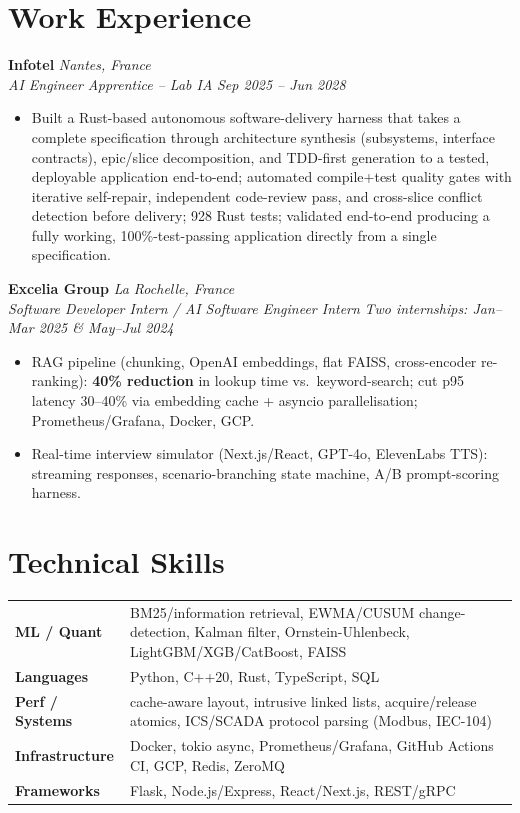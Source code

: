 \documentclass[10pt]{article}
\newcommand{\entry}[4]{%
  \noindent\textbf{#1} \hfill \textit{#2} \\
  \textit{#3} \hfill \textit{#4}\\[-0.3em]
}
\begin{document}
\section*{Work Experience}
\entry{Infotel}{Nantes, France}{AI Engineer Apprentice -- Lab IA}{Sep 2025 -- Jun 2028}
\begin{itemize}
  \item Built a Rust-based autonomous software-delivery harness that takes a complete specification through architecture synthesis (subsystems, interface contracts), epic/slice decomposition, and TDD-first generation to a tested, deployable application end-to-end; automated compile+test quality gates with iterative self-repair, independent code-review pass, and cross-slice conflict detection before delivery; 928 Rust tests; validated end-to-end producing a fully working, 100\%-test-passing application directly from a single specification.
\end{itemize}
\entry{Excelia Group}{La Rochelle, France}{Software Developer Intern / AI Software Engineer Intern}{Two internships: Jan--Mar 2025 \& May--Jul 2024}
\begin{itemize}
  \item RAG pipeline (chunking, OpenAI embeddings, flat FAISS, cross-encoder re-ranking): \textbf{40\% reduction} in lookup time vs.\ keyword-search; cut p95 latency 30--40\% via embedding cache + asyncio parallelisation; Prometheus/Grafana, Docker, GCP.
  \item Real-time interview simulator (Next.js/React, GPT-4o, ElevenLabs TTS): streaming responses, scenario-branching state machine, A/B prompt-scoring harness.
\end{itemize}

\section*{Technical Skills}
\noindent
\begin{tabular}{@{}p{2.7cm}p{15.5cm}@{}}
\textbf{ML / Quant} & BM25/information retrieval, EWMA/CUSUM change-detection, Kalman filter, Ornstein-Uhlenbeck, LightGBM/XGB/CatBoost, FAISS \\
\textbf{Languages} & Python, C++20, Rust, TypeScript, SQL \\
\textbf{Perf / Systems} & cache-aware layout, intrusive linked lists, acquire/release atomics, ICS/SCADA protocol parsing (Modbus, IEC-104) \\
\textbf{Infrastructure} & Docker, tokio async, Prometheus/Grafana, GitHub Actions CI, GCP, Redis, ZeroMQ \\
\textbf{Frameworks} & Flask, Node.js/Express, React/Next.js, REST/gRPC \\
\end{tabular}
\end{document}
